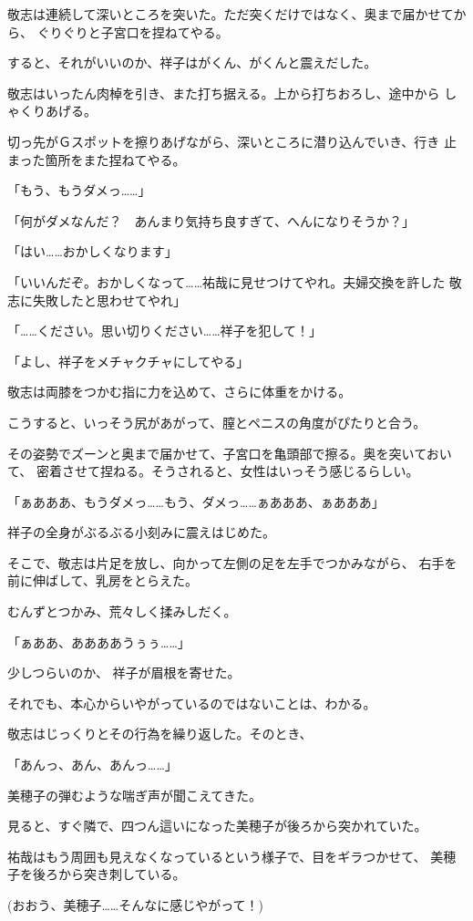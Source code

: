 ﻿\documentclass[
    book,tate,
    line_length=30zw,
    jafontsize=12pt,
    paper=b5j,
    landscape,
    ]{jlreq}
\begin{document}
敬志は連続して深いところを突いた。ただ突くだけではなく、奥まで届かせてから、
ぐりぐりと子宮口を捏ねてやる。

すると、それがいいのか、祥子はがくん、がくんと震えだした。

敬志はいったん肉棹を引き、また打ち据える。上から打ちおろし、途中から
しゃくりあげる。

切っ先がＧスポットを擦りあげながら、深いところに潜り込んでいき、行き
止まった箇所をまた捏ねてやる。

「もう、もうダメっ……」

「何がダメなんだ？　あんまり気持ち良すぎて、へんになりそうか？」

「はい……おかしくなります」

「いいんだぞ。おかしくなって……祐哉に見せつけてやれ。夫婦交換を許した
敬志に失敗したと思わせてやれ」

「……ください。思い切りください……祥子を犯して！」

「よし、祥子をメチャクチャにしてやる」

敬志は両膝をつかむ指に力を込めて、さらに体重をかける。

こうすると、いっそう尻があがって、膣とペニスの角度がぴたりと合う。

その姿勢でズーンと奥まで届かせて、子宮口を亀頭部で擦る。奥を突いておいて、
密着させて捏ねる。そうされると、女性はいっそう感じるらしい。

「ぁあああ、もうダメっ……もう、ダメっ……ぁあああ、ぁあああ」

祥子の全身がぶるぶる小刻みに震えはじめた。

そこで、敬志は片足を放し、向かって左側の足を左手でつかみながら、
右手を前に伸ばして、乳房をとらえた。

むんずとつかみ、荒々しく揉みしだく。

「ぁああ、ああああうぅぅ……」

少しつらいのか、 祥子が眉根を寄せた。

それでも、本心からいやがっているのではないことは、わかる。

敬志はじっくりとその行為を繰り返した。そのとき、

「あんっ、あん、あんっ……」

美穂子の弾むような喘ぎ声が聞こえてきた。

見ると、すぐ隣で、四つん這いになった美穂子が後ろから突かれていた。

祐哉はもう周囲も見えなくなっているという様子で、目をギラつかせて、
美穂子を後ろから突き刺している。

(おおう、美穂子……そんなに感じやがって！)
\end{document}
